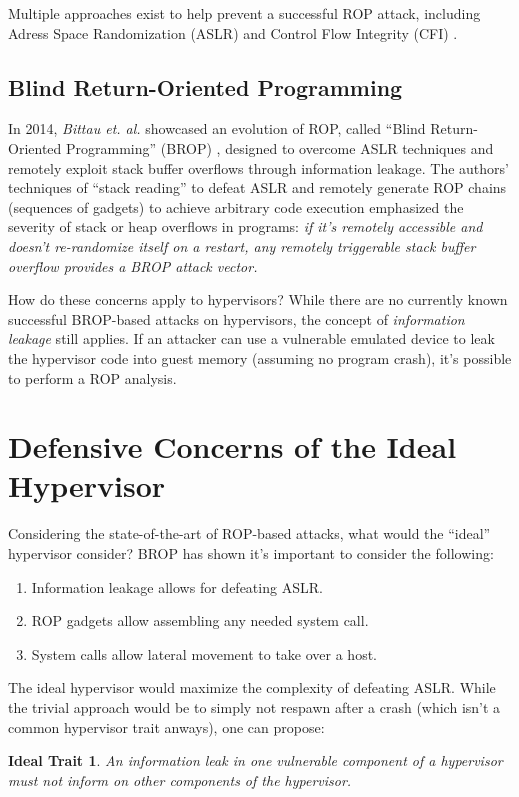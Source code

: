 \documentclass[conference]{IEEEtran}
\newtheorem{trait}{Ideal Trait}
\begin{document}
Multiple approaches exist to help prevent a successful ROP attack,
including Adress Space Randomization (ASLR) and Control Flow Integrity
(CFI) \cite{b4}.

\subsection{Blind Return-Oriented Programming}
In 2014, \emph{Bittau et. al.} showcased an evolution of ROP, called
``Blind Return-Oriented Programming'' (BROP) \cite{b5}, designed to
overcome ASLR techniques and remotely exploit stack buffer overflows
through information leakage. The authors' techniques of ``stack
reading'' to defeat ASLR and remotely generate ROP chains (sequences
of gadgets) to achieve arbitrary code execution emphasized the
severity of stack or heap overflows in programs: \emph{if it's
remotely accessible and doesn't re-randomize itself on a restart, any
remotely triggerable stack buffer overflow provides a BROP attack
vector.}

How do these concerns apply to hypervisors? While there are no
currently known successful BROP-based attacks on hypervisors, the
concept of \emph{information leakage} still applies. If an attacker
can use a vulnerable emulated device to leak the hypervisor code into
guest memory (assuming no program crash), it's possible to perform a
ROP analysis.


\section{Defensive Concerns of the Ideal Hypervisor} \label{traits}
Considering the state-of-the-art of ROP-based attacks, what would the
``ideal'' hypervisor consider? BROP has shown it's important to
consider the following:

\begin{enumerate}
\item Information leakage allows for defeating ASLR.
\item ROP gadgets allow assembling any needed system call.
\item System calls allow lateral movement to take over a host.
\end{enumerate}

The ideal hypervisor would maximize the complexity of defeating
ASLR. While the trivial approach would be to simply not respawn after
a crash (which isn't a common hypervisor trait anways), one can
propose:

\begin{trait} \label{trait1}
  An information leak in one vulnerable component of a hypervisor must
  not inform on other components of the hypervisor.
\end{trait}
\end{document}
